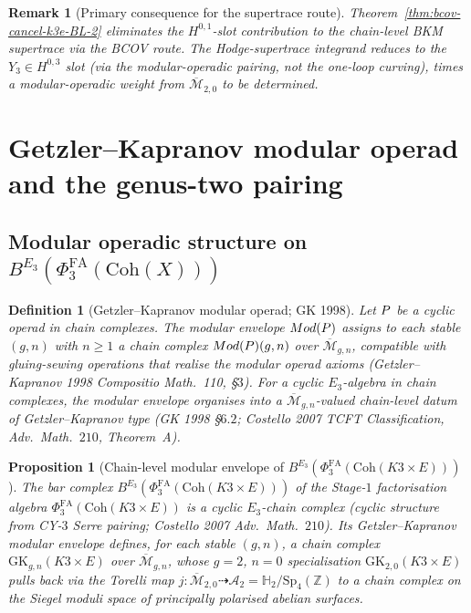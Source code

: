 \documentclass[11pt]{article}
\newtheorem{proposition}[theorem]{Proposition}
\newtheorem{definition}[theorem]{Definition}
\newtheorem{remark}[theorem]{Remark}
\providecommand{\Ethree}{E_3}
\providecommand{\Coh}{\mathrm{Coh}}
\providecommand{\cA}{\mathcal{A}}
\providecommand{\ZZ}{\mathbb{Z}}
\providecommand{\HHH}{\mathbb{H}}
\providecommand{\Mbar}{\overline{\mathcal M}}
\providecommand{\PhiFA}{\Phi^{\mathrm{FA}}}
\begin{document}
\begin{remark}[Primary consequence for the supertrace route]
Theorem~\ref{thm:bcov-cancel-k3e-BL-2} eliminates the $H^{0, 1}$-slot
contribution to the chain-level BKM supertrace via the BCOV route.
The Hodge-supertrace integrand reduces to the $Y_3 \in H^{0, 3}$ slot
(via the modular-operadic pairing, not the one-loop curving), times a
modular-operadic weight from $\Mbar_{2, 0}$ to be determined.
\end{remark}

\section{Getzler--Kapranov modular operad and the genus-two pairing}
\label{sec:gk-modular-operadic}

\subsection{Modular operadic structure on $B^{\Ethree}(\PhiFA_3(\Coh(X)))$}

\begin{definition}[Getzler--Kapranov modular operad; GK 1998]
\label{def:gk-modular-k3e-BL-2}
Let $P$ be a cyclic operad in chain complexes. The \emph{modular
envelope} $Mod(P)$ assigns to each stable $(g, n)$ with
$n \geq 1$ a chain complex $Mod(P)(g, n)$ over $\Mbar_{g, n}$,
compatible with gluing-sewing operations that realise the modular operad
axioms (Getzler--Kapranov 1998 \emph{Compositio Math.}~110, \S$3$).
For a cyclic $\Ethree$-algebra in chain complexes, the modular envelope
organises into a $\Mbar_{g, n}$-valued chain-level datum of
Getzler--Kapranov type (GK 1998 \S$6.2$; Costello 2007 TCFT Classification,
\emph{Adv.\ Math.}~$210$, Theorem~A).
\end{definition}

\begin{proposition}[Chain-level modular envelope of $B^{\Ethree}(\PhiFA_3(\Coh(K3 \times E)))$]
\label{prop:modular-envelope-bar-phi-fa-k3e-BL-2}
The bar complex $B^{\Ethree}(\PhiFA_3(\Coh(K3 \times E)))$ of the
Stage-$1$ factorisation algebra $\PhiFA_3(\Coh(K3 \times E))$ is a
cyclic $\Ethree$-chain complex (cyclic structure from CY-$3$ Serre
pairing; Costello 2007 \emph{Adv.\ Math.}~$210$). Its Getzler--Kapranov
modular envelope defines, for each stable $(g, n)$, a chain complex
$\mathrm{GK}_{g, n}(K3 \times E)$ over $\Mbar_{g, n}$, whose $g = 2$,
$n = 0$ specialisation $\mathrm{GK}_{2, 0}(K3 \times E)$ pulls back via
the Torelli map $j \colon \Mbar_{2, 0} \dashrightarrow \cA_2 =
\HHH_2/\mathrm{Sp}_4(\ZZ)$ to a chain complex on the Siegel moduli
space of principally polarised abelian surfaces.
\end{proposition}
\end{document}
